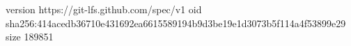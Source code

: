 version https://git-lfs.github.com/spec/v1
oid sha256:414acedb36710e431692ea6615589194b9d3be19e1d3073b5f114a4f53899e29
size 189851
